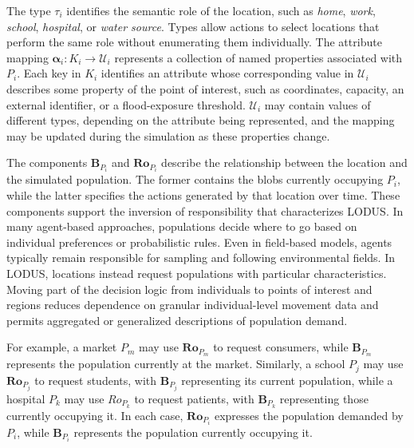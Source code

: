 The type $\tau_i$ identifies the semantic role of the location, such as \textit{home}, \textit{work}, \textit{school}, \textit{hospital}, or \textit{water source}. Types allow actions to select locations that perform the same role without enumerating them individually. 
The attribute mapping $\bm{\alpha}_i:K_i\rightarrow\mathcal{U}_i$ represents a collection of named properties associated with $P_i$. Each key in $K_i$ identifies an attribute whose corresponding value in $\mathcal{U}_i$ describes some property of the point of interest, such as coordinates, capacity, an external identifier, or a flood-exposure threshold. $\mathcal{U}_i$ may contain values of different types, depending on the attribute being represented, and the mapping may be updated during the simulation as these properties change. %


The components $\bm{B}_{P_i}$ and $\bm{Ro}_{P_i}$ describe the relationship between the location and the simulated population. The former contains the blobs currently occupying $P_i$, while the latter specifies the actions generated by that location over time. 
These components support the inversion of responsibility that characterizes LODUS. In many agent-based approaches, populations decide where to go based on individual preferences or probabilistic rules. Even in field-based models, agents typically remain responsible for sampling and following environmental fields. 
In LODUS, locations instead request populations with particular characteristics. Moving part of the decision logic from individuals to points of interest and regions reduces dependence on granular individual-level movement data and permits aggregated or generalized descriptions of population demand.
 
For example, a market $P_m$ may use $\bm{Ro}_{P_m}$ to request consumers, while $\bm{B}_{P_m}$ represents the population currently at the market. Similarly, a school $P_j$ may use $\bm{Ro}_{P_j}$ to request students, with $\bm{B}_{P_j}$ representing its current population, while a hospital $P_k$ may use $Ro_{P_k}$ to request patients, with $\bm{B}_{P_k}$ representing those currently occupying it. In each case, $\bm{Ro}_{P_i}$ expresses the population demanded by $P_i$, while $\bm{B}_{P_i}$ represents the population currently occupying it.%

